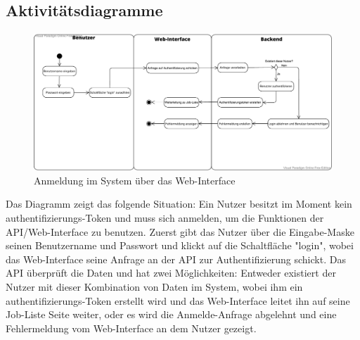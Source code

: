 \subsection{Aktivitätsdiagramme}
\begin{figure}[H]
    \centering
    \includegraphics[width=\textwidth]{images-interface/Anmelden_Aktivitaetsdiagramm.pdf}
    \caption{Anmeldung im System über das Web-Interface}
    \label{fig:login_activity}
    
\end{figure}
Das Diagramm zeigt das folgende Situation: Ein \gls{Nutzer} besitzt im Moment kein authentifizierungs-\gls{Token} und muss sich anmelden, um die Funktionen der \gls{API}/Web-Interface zu benutzen. Zuerst gibt das \gls{Nutzer} über die Eingabe-Maske seinen Benutzername und Passwort und klickt auf die Schaltfläche "login", wobei das Web-Interface seine Anfrage an der \gls{API} zur Authentifizierung schickt. Das \gls{API} überprüft die Daten und hat zwei Möglichkeiten: Entweder existiert der \gls{Nutzer} mit dieser Kombination von Daten im System, wobei ihm ein authentifizierungs-\gls{Token} erstellt wird und das Web-Interface leitet ihn auf seine Job-Liste Seite weiter, oder es wird die Anmelde-Anfrage abgelehnt und eine Fehlermeldung vom Web-Interface an dem \gls{Nutzer} gezeigt.


